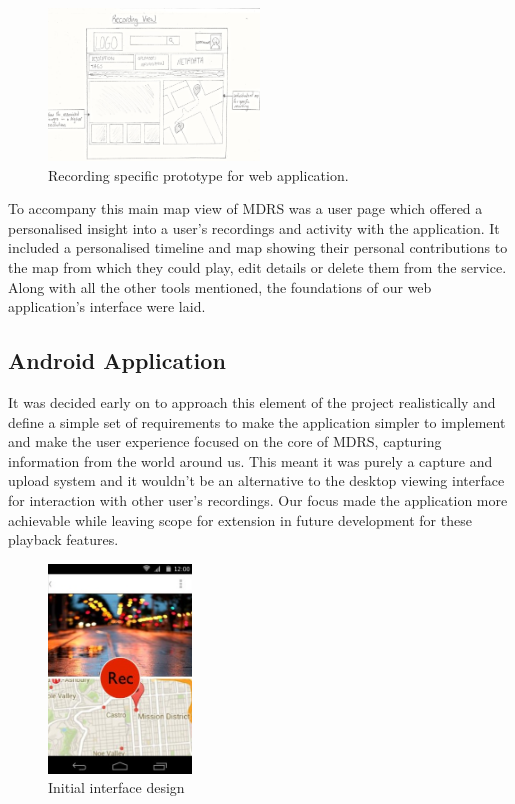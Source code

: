 \documentclass{l3proj}
\begin{document}
\begin{figure}[ht!]
  \centering
\includegraphics[width=0.5\textwidth]{images/web-recording-view.jpg}
\caption{Recording specific prototype for web application.}
\end{figure}

To accompany this main map view of MDRS was a user page which offered a
personalised insight into a user’s recordings and activity with the application.
It included a personalised timeline and map showing their personal contributions
to the map from which they could play, edit details or delete them from the
service. Along with all the other tools mentioned, the foundations of our
web application’s interface were laid.

\subsection{Android Application} It was decided early on to approach this
element of the project realistically and define a simple set of requirements to
make the application simpler to implement and make the user experience focused
on the core of MDRS, capturing information from the world around us. This meant
it was purely a capture and upload system and it wouldn’t be an alternative to
the desktop viewing interface for interaction with other user’s recordings. Our
focus made the application more achievable while leaving scope for extension in
future development for these playback features.

\begin{figure}
  \begin{center}
    \includegraphics[width=0.34\textwidth]{images/android-digital-prototype-1.jpg}
  \end{center}
  \caption{Initial interface design}
\end{figure}
\end{document}
